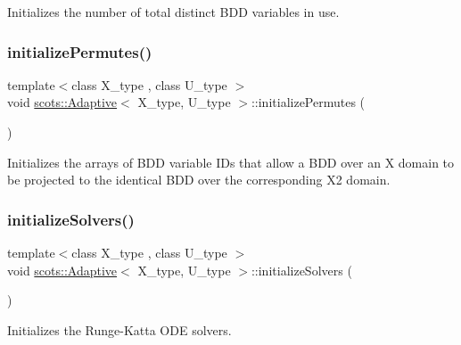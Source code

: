 Initializes the number of total distinct B\+DD variables in use. \mbox{\label{classscots_1_1Adaptive_a7351461977b9be0f07ec2974531af677}} 
\subsubsection{\texorpdfstring{initialize\+Permutes()}{initializePermutes()}}
{\footnotesize\ttfamily template$<$class X\+\_\+type , class U\+\_\+type $>$ \\
void \hyperlink{classscots_1_1Adaptive}{scots\+::\+Adaptive}$<$ X\+\_\+type, U\+\_\+type $>$\+::initialize\+Permutes (\begin{DoxyParamCaption}{ }\end{DoxyParamCaption})\hspace{0.3cm}{\ttfamily [inline]}}

Initializes the arrays of B\+DD variable I\+Ds that allow a B\+DD over an X domain to be projected to the identical B\+DD over the corresponding X2 domain. \mbox{\label{classscots_1_1Adaptive_ae560144f79da25ac086d5ac0589397a8}} 
\subsubsection{\texorpdfstring{initialize\+Solvers()}{initializeSolvers()}}
{\footnotesize\ttfamily template$<$class X\+\_\+type , class U\+\_\+type $>$ \\
void \hyperlink{classscots_1_1Adaptive}{scots\+::\+Adaptive}$<$ X\+\_\+type, U\+\_\+type $>$\+::initialize\+Solvers (\begin{DoxyParamCaption}{ }\end{DoxyParamCaption})\hspace{0.3cm}{\ttfamily [inline]}}

Initializes the Runge-\/\+Katta O\+DE solvers. \mbox{\label{classscots_1_1Adaptive_aac25a2399ed09b07ef546579c94b0726}} 
